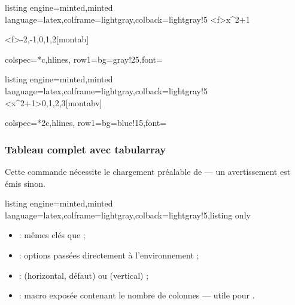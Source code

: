 \documentclass[11pt,a4paper]{ltxdoc}
\begin{document}
\begin{tcblisting}{listing engine=minted,minted language=latex,colframe=lightgray,colback=lightgray!5}
\GenererFonction<f>{x^2+1}

\CalcTableauValeurs[Arrondi=1]<f>{-2,-1,0,1,2}[montab]

\begin{tblr}%
  [expand=\montab]%
  {%
    colspec={*{\montabnbvals}{c}},hlines,%
    row{1}={bg=gray!25,font=\bfseries}%
  }
  \montab
\end{tblr}
\end{tcblisting}

\begin{tcblisting}{listing engine=minted,minted language=latex,colframe=lightgray,colback=lightgray!5}
\CalcTableauValeurs*%
  [Expr,NomFct=g,NomVar=t]%
  <x^2+1>{0,1,2,3}[montabv]

\begin{tblr}%
  [expand=\montabv]%
  {%
    colspec={*{2}{c}},hlines,%
    row{1}={bg=blue!15,font=\bfseries}%
  }
  \montabv
\end{tblr}
\end{tcblisting}

\subsubsection{Tableau complet avec \textsf{tabularray}}

\begin{tcolorbox}[colframe=orange,colback=orange!5]
Cette commande nécessite le chargement préalable de
 — un avertissement est émis sinon.
\end{tcolorbox}

\begin{tcblisting}{listing engine=minted,minted language=latex,colframe=lightgray,colback=lightgray!5,listing only}

\end{tcblisting}

\begin{itemize}
  \item \MontreCode{[clés]} : mêmes clés que
   ;
  \item {} : options passées directement à l'environnement ;
  \item {} :  (horizontal, défaut) ou  (vertical) ;
  \item {} : macro exposée contenant le nombre de colonnes — utile pour .
\end{itemize}
\end{document}
